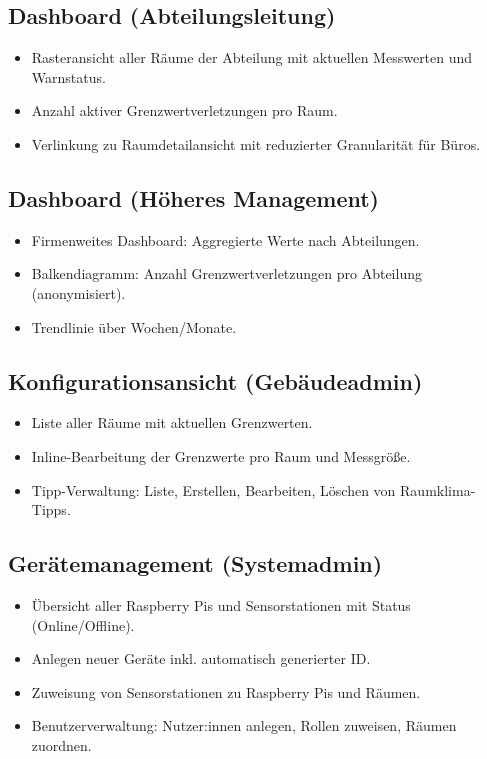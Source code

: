 \documentclass[12pt,a4paper]{article}
\begin{document}
\subsection{Dashboard (Abteilungsleitung)}
\begin{itemize}
  \item Rasteransicht aller Räume der Abteilung mit aktuellen Messwerten und Warnstatus.
  \item Anzahl aktiver Grenzwertverletzungen pro Raum.
  \item Verlinkung zu Raumdetailansicht mit reduzierter Granularität für Büros.
\end{itemize}

\subsection{Dashboard (Höheres Management)}
\begin{itemize}
  \item Firmenweites Dashboard: Aggregierte Werte nach Abteilungen.
  \item Balkendiagramm: Anzahl Grenzwertverletzungen pro Abteilung (anonymisiert).
  \item Trendlinie über Wochen/Monate.
\end{itemize}

\subsection{Konfigurationsansicht (Gebäudeadmin)}
\begin{itemize}
  \item Liste aller Räume mit aktuellen Grenzwerten.
  \item Inline-Bearbeitung der Grenzwerte pro Raum und Messgröße.
  \item Tipp-Verwaltung: Liste, Erstellen, Bearbeiten, Löschen von Raumklima-Tipps.
\end{itemize}

\subsection{Gerätemanagement (Systemadmin)}
\begin{itemize}
  \item Übersicht aller Raspberry Pis und Sensorstationen mit Status (Online/Offline).
  \item Anlegen neuer Geräte inkl. automatisch generierter ID.
  \item Zuweisung von Sensorstationen zu Raspberry Pis und Räumen.
  \item Benutzerverwaltung: Nutzer:innen anlegen, Rollen zuweisen, Räumen zuordnen.
\end{itemize}
\end{document}

